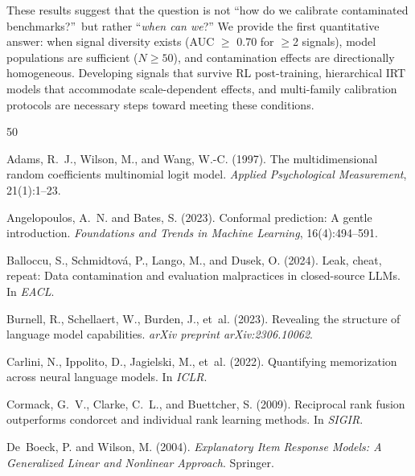 \documentclass[11pt,a4paper]{article}
\begin{document}
These results suggest that the question is not ``how do we calibrate contaminated benchmarks?''\ but rather ``\emph{when can we}?''
We provide the first quantitative answer: when signal diversity exists (AUC $\geq$ 0.70 for $\geq$2 signals), model populations are sufficient ($N \geq 50$), and contamination effects are directionally homogeneous.
Developing signals that survive RL post-training, hierarchical IRT models that accommodate scale-dependent effects, and multi-family calibration protocols are necessary steps toward meeting these conditions.



\begin{thebibliography}{50}

Adams, R.~J., Wilson, M., and Wang, W.-C. (1997).
\newblock The multidimensional random coefficients multinomial logit model.
\newblock \emph{Applied Psychological Measurement}, 21(1):1--23.

Angelopoulos, A.~N. and Bates, S. (2023).
\newblock Conformal prediction: A gentle introduction.
\newblock \emph{Foundations and Trends in Machine Learning}, 16(4):494--591.

Balloccu, S., Schmidtov{\'a}, P., Lango, M., and Dusek, O. (2024).
\newblock Leak, cheat, repeat: Data contamination and evaluation malpractices in closed-source {LLM}s.
\newblock In \emph{EACL}.

Burnell, R., Schellaert, W., Burden, J., et~al. (2023).
\newblock Revealing the structure of language model capabilities.
\newblock \emph{arXiv preprint arXiv:2306.10062}.

Carlini, N., Ippolito, D., Jagielski, M., et~al. (2022).
\newblock Quantifying memorization across neural language models.
\newblock In \emph{ICLR}.

Cormack, G.~V., Clarke, C.~L., and Buettcher, S. (2009).
\newblock Reciprocal rank fusion outperforms condorcet and individual rank learning methods.
\newblock In \emph{SIGIR}.

De~Boeck, P. and Wilson, M. (2004).
\newblock \emph{Explanatory Item Response Models: A Generalized Linear and Nonlinear Approach}.
\newblock Springer.


\end{thebibliography}
\end{document}
